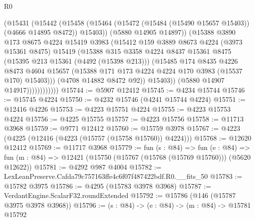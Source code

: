 \begin{lexlean}{R0}
\begin{coremodule}
                          (@15431
                            (@15442
                              (@15458
                                (@15464
                                  (@15472 (@15484 (@15490 @15657 @15403)) (@4666 @14895 @8472))
                                  @15403))
                              (@5880 @14905 @14897))
                            (@15388
                              @3890
                              @173
                              @8675
                              @4224
                              @15419
                              @3983
                              (@15412
                                @159
                                @3889
                                @8673
                                @4224
                                (@3973 @15361 @8475)
                                @15419
                                (@15388
                                  @315
                                  @3358
                                  @4224
                                  @8437
                                  @15361
                                  @8475
                                  (@15395 @213 @15361 (@4492 (@15398 @213)))
                                  (@15485
                                    @174
                                    @8435
                                    @4226
                                    @8473
                                    @4604
                                    @15657
                                    (@15388 @171 @173 @4224 @4224 @170 @3983 (@15537 @170) @15403)))
                                (@4708 @14882 @8472 @92))
                              @15403))
                          (@5880 @14907 @14917))))))))))))
@15744 := @5907 @12412
@15745 := @4234 @15744
@15746 := @15745 @4224
@15750 := @4232 @15746 (@4241 @15744 @4224)
@15751 := @12416 @4226
@15753 := @4223 @15751 @4224
@15755 := @4223 @15753 @4224
@15756 := @4225 @15755
@15757 := @4223 @15756
@15758 := @11713 @3968
@15759 := @9771 @12412
@15760 := @15759 @3978
@15767 := @4223 (@4225 (@12416 (@4223 (@15757 (@15758 @15760)) @4224)))
@15768 := @12620 @12412
@15769 := @11717 @3968
@15779 := fun (s : @84) =>
  fun (e : @84) => fun (m : @84) => @12421 (@15750 (@15767 (@15768 (@15769 @15760))) (@5620 @12622))
@15781 := @4292 @987 @4004
@15782 := LexLeanPreserve.Cafda79c757163ffe4c6f07f487422bdf.R0.__fits_50
@15783 := @15782 @3975
@15786 := @4295 (@15783 @3978 @3968)
@15787 := VerdantEngine.ScalarF32.roundExtended
@15792 := @15786 (@146 (@15787 @3975 @3978 @3968))
@15796 := (s : @84) -> (e : @84) -> (m : @84) -> @15781 @15792

\end{coremodule}
\end{lexlean}
